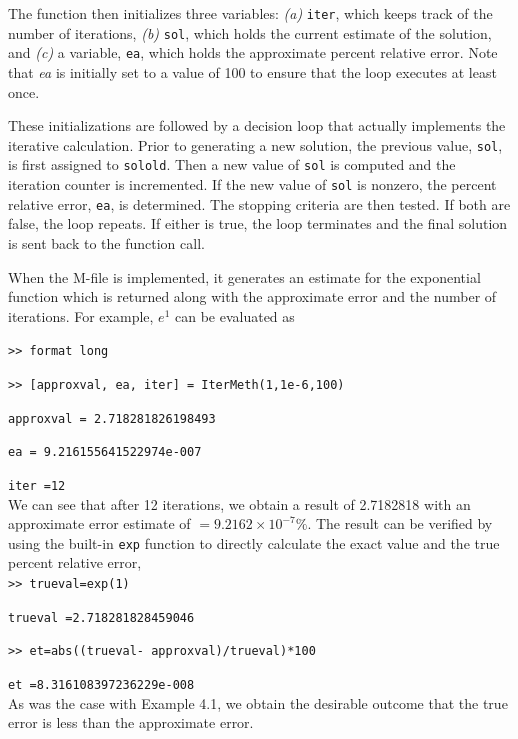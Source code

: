 \documentclass[../main.tex]{subfiles}
\begin{document}
The function then initializes three variables: \emph{(a)} \texttt{iter}, which keeps track of the number
of iterations, \emph{(b)} \texttt{sol}, which holds the current estimate of the solution, and \emph{(c)} a variable,
\texttt{ea}, which holds the approximate percent relative error. Note that \emph{ea} is initially set to a value
of 100 to ensure that the loop executes at least once.

These initializations are followed by a decision loop that actually implements the
iterative calculation. Prior to generating a new solution, the previous value, \texttt{sol}, is first assigned
to \texttt{solold}. Then a new value of \texttt{sol} is computed and the iteration counter is incremented.
If the new value of \texttt{sol} is nonzero, the percent relative error, \texttt{ea}, is determined.
The stopping criteria are then tested. If both are false, the loop repeats. If either is
true, the loop terminates and the final solution is sent back to the function call.

When the M-file is implemented, it generates an estimate for the exponential function
which is returned along with the approximate error and the number of iterations. For
example, $e^1$ can be evaluated as

\texttt{>> format long}

\texttt{>> [approxval, ea, iter] = IterMeth(1,1e-6,100)}

\texttt{approxval = 2.718281826198493}

\texttt{ea = 9.216155641522974e-007}

\texttt{iter =12}\\

We can see that after 12 iterations, we obtain a result of 2.7182818 with an
approximate error estimate of $= 9.2162 \times 10^{-7}\%$. The result can be verified by using
the built-in \texttt{exp} function to directly calculate the exact value and the true percent relative
error,\\

\texttt{>> trueval=exp(1)}

\texttt{trueval =2.718281828459046}

\texttt{>> et=abs((trueval- approxval)/trueval)*100}

\texttt{et =8.316108397236229e-008}\\
    
\noindent
As was the case with Example 4.1, we obtain the desirable outcome that the true error is
less than the approximate error.
\vspace{10 mm}
\end{document}
